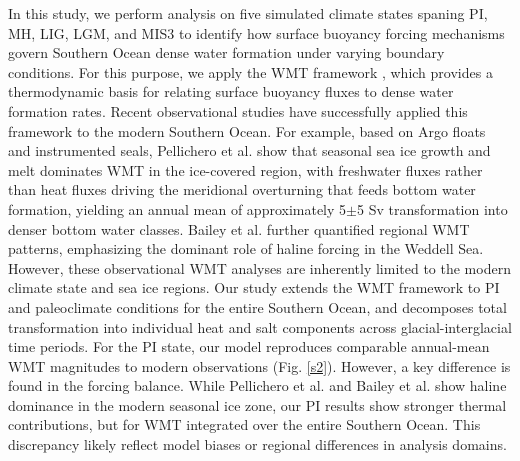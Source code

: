 \documentclass[pdflatex,sn-nature]{sn-jnl}
\begin{document}
In this study, we perform analysis on five simulated climate states spaning PI, MH, LIG, LGM, and MIS3 to identify how surface buoyancy forcing mechanisms govern Southern Ocean dense water formation under varying boundary conditions. For this purpose, we apply the WMT framework \cite{Walin1982,Groeskamp2019,drake2025water}, which  provides a thermodynamic basis for relating surface buoyancy fluxes to dense water formation rates. Recent observational studies have successfully applied this framework to the modern Southern Ocean. For example, based on Argo floats and instrumented seals, Pellichero et al. \cite{Pellichero2018} show that seasonal sea ice growth and melt dominates WMT in the ice-covered region, with freshwater fluxes rather than heat fluxes driving the meridional overturning that feeds bottom water formation, yielding an annual mean of approximately 5$\pm$5 Sv transformation into denser bottom water classes. Bailey et al. \cite{Bailey2023} further quantified regional WMT patterns, emphasizing the dominant role of haline forcing in the Weddell Sea. However, these observational WMT analyses are inherently limited to the modern climate state and sea ice regions. Our study extends the WMT framework to PI and paleoclimate conditions for the entire Southern Ocean, and decomposes total transformation into individual heat and salt components across glacial-interglacial time periods. For the PI state, our model reproduces comparable annual-mean WMT magnitudes to modern observations (Fig. \ref{s2}). However, a key difference is found in the forcing balance. While Pellichero et al. and Bailey et al. \cite{Pellichero2018,Bailey2023} show haline dominance in the modern seasonal ice zone, our PI results show stronger thermal contributions, but for WMT integrated over the entire Southern Ocean. This discrepancy likely reflect model biases or regional differences in analysis domains.
\end{document}
